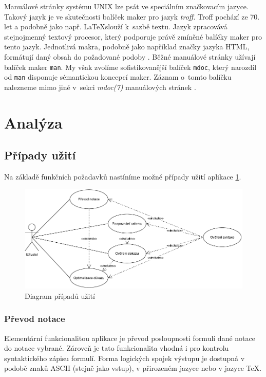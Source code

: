 \documentclass[thesis=B,czech,hidelinks]{thesis}[2012/06/26]
\begin{document}
Manuálové stránky systému UNIX lze psát ve speciálním značkovacím jazyce. Takový jazyk je ve skutečnosti balíček maker pro jazyk \emph{troff}. Troff pochází ze 70. let a podobně jako např. \LaTeX slouží k~sazbě textu. Jazyk zpracovává stejnojmenný textový procesor, který podporuje právě zmíněné balíčky maker pro tento jazyk. Jednotlivá makra, podobně jako například značky jazyka HTML, formátují daný obsah do požadované podoby \cite{troff}. Běžné manuálové stránky užívají balíček maker \texttt{man}. My však zvolíme sofistikovanější balíček \texttt{mdoc}, který narozdíl od \texttt{man} disponuje sémantickou koncepcí maker. Záznam o~tomto balíčku nalezneme mimo jiné v~sekci \emph{mdoc(7)} manuálových stránek \cite{mdoc}.

\section{Analýza}

\subsection{Případy užití}

Na základě funkčních požadavků nastíníme možné případy užití aplikace \ref{fig:use_case}.

\begin{figure}
	\centering
	\caption{Diagram případů užití}
	\label{fig:use_case}
	\includegraphics{diagrams/use_case}
\end{figure}

\subsubsection{Převod notace}

Elementární funkcionalitou aplikace je převod posloupnosti formulí dané notace do notace vybrané. Zároveň je tato funkcionalita vhodná i pro kontrolu syntaktického zápisu formulí. Forma logických spojek výstupu je dostupná v podobě znaků ASCII (stejně jako vstup), v přirozeném jazyce nebo v jazyce \TeX .
\end{document}
